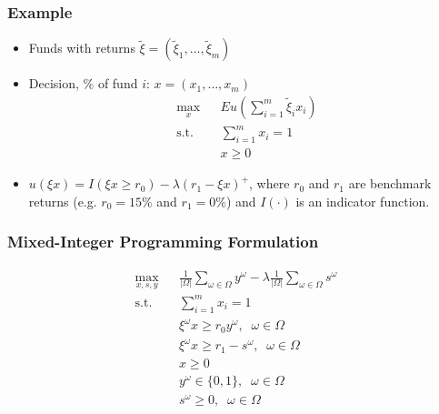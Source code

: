 \documentclass[12pt,handout]{beamer}
\begin{document}
\begin{frame}
\frametitle{Example}
\begin{itemize}
\item Funds with returns $\tilde{\xi} = (\tilde{\xi}_1,\ldots,\tilde{\xi}_m)$
\item Decision, \% of fund $i$: $x = (x_1, \ldots, x_m)$
\begin{eqnarray}
\max_x && Eu \left(\sum_{i = 1}^m \tilde{\xi}_i x_i \right) \nonumber \\
\mbox{s.t.} && \sum_{i = 1}^m x_i = 1 \nonumber \\
&& x \ge 0 \nonumber
\end{eqnarray}
\item $u(\xi x) = I(\xi x \ge r_0) - \lambda(r_1 - \xi x)^+$, where $r_0$ and $r_1$ are benchmark returns (e.g. $r_0 = 15\%$ and $r_1 = 0\%$) and $I(\cdot)$ is an indicator function.
\end{itemize}
\end{frame}

\begin{frame}
\frametitle{Mixed-Integer Programming Formulation}
\begin{eqnarray}
\max_{x, s, y} && \frac{1}{|\Omega|} \sum_{\omega \in \Omega} y^\omega - \lambda \frac{1}{|\Omega|} \sum_{\omega \in \Omega}s^\omega \nonumber \\
\mbox{s.t.} && \sum_{i = 1}^m x_i = 1 \nonumber \\
&& \xi^\omega x \ge r_0 y^\omega,\;\;\omega \in \Omega \nonumber \\
&& \xi^\omega x \ge r_1 - s^\omega,\;\;\omega \in \Omega \nonumber \\
&& x \ge 0 \nonumber \\
&& y^\omega \in \{0, 1\},\;\;\omega \in \Omega \nonumber \\
&& s^\omega \ge 0,\;\;\omega \in \Omega \nonumber
\end{eqnarray}
\end{frame}
\end{document}
